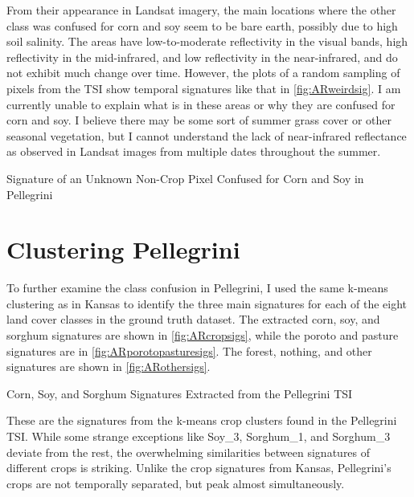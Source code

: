 From their appearance in Landsat imagery, the main locations where the other class was confused for corn and soy seem to be bare earth, possibly due to high soil salinity. The areas have low-to-moderate reflectivity in the visual bands, high reflectivity in the mid-infrared, and low reflectivity in the near-infrared, and do not exhibit much change over time. However, the plots of a random sampling of pixels from the TSI show temporal signatures like that in \autoref{fig:ARweirdsig}.
I am currently unable to explain what is in these areas or why they are confused for corn and soy. I believe there may be some sort of summer grass cover or other seasonal vegetation, but I cannot understand the lack of near-infrared reflectance as observed in Landsat images from multiple dates throughout the summer.

\begin{ssfigure}
  \centering
  
  \caption{Signature of an Unknown Non-Crop Pixel Confused for Corn and Soy in Pellegrini}
  \label{fig:ARweirdsig}
\end{ssfigure}


\section{Clustering Pellegrini}

To further examine the class confusion in Pellegrini, I used the same k-means clustering as in Kansas to identify the three main signatures for each of the eight land cover classes in the ground truth dataset. The extracted corn, soy, and sorghum signatures are shown in \autoref{fig:ARcropsigs}, while the poroto and pasture signatures are in \autoref{fig:ARporotopasturesigs}. The forest, nothing, and other signatures are shown in \autoref{fig:ARothersigs}.

\begin{ssfigure}
  \centering
  
  \caption{Corn, Soy, and Sorghum Signatures Extracted from the Pellegrini TSI}
  \medskip
  \small
  These are the signatures from the k-means crop clusters found in the Pellegrini TSI. While some strange exceptions like Soy\_3, Sorghum\_1, and Sorghum\_3 deviate from the rest, the overwhelming similarities between signatures of different crops is striking. Unlike the crop signatures from Kansas, Pellegrini's crops are not temporally separated, but peak almost simultaneously.
  \label{fig:ARcropsigs}
\end{ssfigure}

